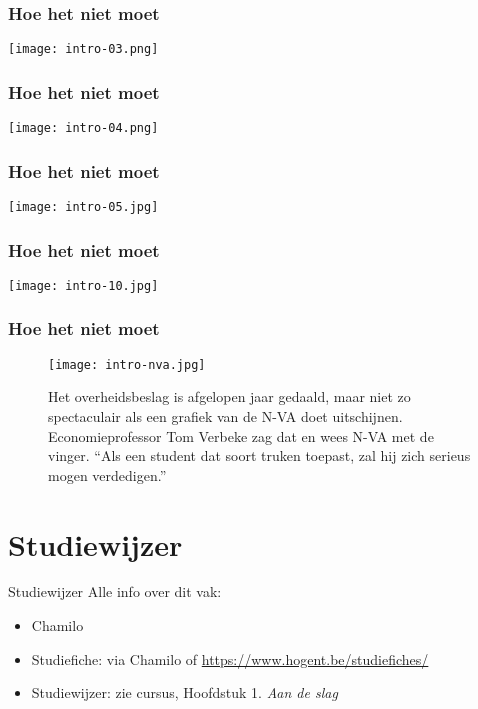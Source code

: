 \documentclass[aspectratio=169]{beamer}
\begin{document}
\begin{frame}
  \frametitle{Hoe het niet moet}
  
  \centering
  \texttt{[image: intro-03.png]}
\end{frame}

\begin{frame}
  \frametitle{Hoe het niet moet}
  
  \centering
  \texttt{[image: intro-04.png]}
\end{frame}

\begin{frame}
  \frametitle{Hoe het niet moet}
  
  \centering
  \texttt{[image: intro-05.jpg]}
\end{frame}

\begin{frame}
  \frametitle{Hoe het niet moet}
  
  \centering
  \texttt{[image: intro-10.jpg]}
\end{frame}

\begin{frame}
  \frametitle{Hoe het niet moet}
  
  \begin{figure}
    \texttt{[image: intro-nva.jpg]}
    \caption{Het overheidsbeslag is afgelopen jaar gedaald, maar niet zo spectaculair als een grafiek van de N-VA doet uitschijnen. Economieprofessor Tom Verbeke zag dat en wees N-VA met de vinger. ``Als een student dat soort truken toepast, zal hij zich serieus mogen verdedigen.''}
  \end{figure}
  
\end{frame}

\section{Studiewijzer}

\begin{frame}{Studiewijzer}
  Alle info over dit vak:
  
  \begin{itemize}
    \item Chamilo
    \item Studiefiche: via Chamilo of \url{https://www.hogent.be/studiefiches/}
    \item Studiewijzer: zie cursus, Hoofdstuk 1. \textit{Aan de slag}
  \end{itemize}
\end{frame}
\end{document}
